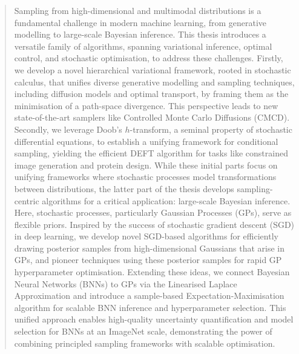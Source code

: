\begin{abstract}
Sampling from high-dimensional and multimodal distributions is a fundamental challenge in modern machine learning, from generative modelling to large-scale Bayesian inference. This thesis introduces a versatile family of algorithms, spanning variational inference, optimal control, and stochastic optimisation, to address these challenges. Firstly, we develop a novel hierarchical variational framework, rooted in stochastic calculus, that unifies diverse generative modelling and sampling techniques, including diffusion models and optimal transport, by framing them as the minimisation of a path-space divergence. This perspective leads to new state-of-the-art samplers like Controlled Monte Carlo Diffusions (CMCD). Secondly, we leverage Doob’s \(h\)-transform, a seminal property of stochastic differential equations, to establish a unifying framework for conditional sampling, yielding the efficient DEFT algorithm for tasks like constrained image generation and protein design.
While these initial parts focus on unifying frameworks where stochastic processes model transformations between distributions, the latter part of the thesis develops sampling-centric algorithms for a critical application: large-scale Bayesian inference. Here, stochastic processes, particularly Gaussian Processes (GPs), serve as flexible priors. Inspired by the success of stochastic gradient descent (SGD) in deep learning, we develop novel SGD-based algorithms for efficiently drawing posterior samples from high-dimensional Gaussians that arise in GPs, and pioneer techniques using these posterior samples for rapid GP hyperparameter optimisation. Extending these ideas, we connect Bayesian Neural Networks (BNNs) to GPs via the Linearised Laplace Approximation and introduce a sample-based Expectation-Maximisation algorithm for scalable BNN inference and hyperparameter selection. This unified approach enables high-quality uncertainty quantification and model selection for BNNs at an ImageNet scale, demonstrating the power of combining principled sampling frameworks with scalable optimisation.


\end{abstract}

